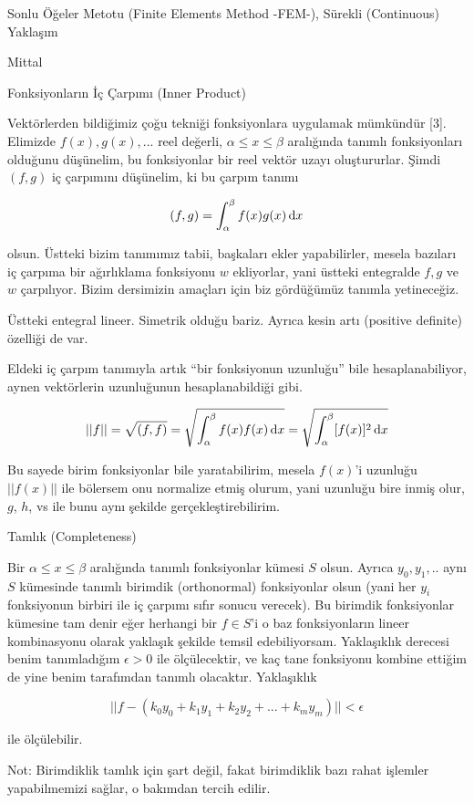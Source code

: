 \documentclass[12pt,fleqn]{article}\usepackage{../../common}
\begin{document}
Sonlu Öğeler Metotu (Finite Elements Method -FEM-), Sürekli (Continuous) Yaklaşım

Mittal

Fonksiyonların İç Çarpımı (Inner Product)

Vektörlerden bildiğimiz çoğu tekniği fonksiyonlara uygulamak mümkündür [3].
Elimizde $f(x), g(x), ...$ reel değerli, $\alpha \le x \le \beta$ aralığında
tanımlı fonksiyonları olduğunu düşünelim, bu fonksiyonlar bir reel vektör uzayı
oluştururlar. Şimdi $(f,g)$ iç çarpımını düşünelim, ki bu çarpım tanımı

$$
(f,g) = \int_{\alpha}^{\beta} f(x) g(x) \,\mathrm{d} x
$$

olsun. Üstteki bizim tanımımız tabii, başkaları ekler yapabilirler, mesela
bazıları iç çarpıma bir ağırlıklama fonksiyonu $w$ ekliyorlar, yani üstteki
entegralde $f,g$ ve $w$ çarpılıyor. Bizim dersimizin amaçları için biz
gördüğümüz tanımla yetineceğiz.

Üstteki entegral lineer. Simetrik olduğu bariz. Ayrıca kesin artı (positive
definite) özelliği de var.

Eldeki iç çarpım tanımıyla artık ``bir fonksiyonun uzunluğu'' bile
hesaplanabiliyor, aynen vektörlerin uzunluğunun hesaplanabildiği gibi.

$$
|| f || = \sqrt{ (f,f) } =
\sqrt{\int_{\alpha}^{\beta} f(x) f(x) \,\mathrm{d} x } =
\sqrt{\int_{\alpha}^{\beta} [f(x)]^2 \,\mathrm{d} x }
$$

Bu sayede birim fonksiyonlar bile yaratabilirim, mesela $f(x)$'i uzunluğu
$||f(x)||$ ile bölersem onu normalize etmiş olurum, yani uzunluğu bire inmiş
olur, $g$, $h$, vs ile bunu aynı şekilde gerçekleştirebilirim.

Tamlık (Completeness)

Bir $\alpha \le x \le \beta$ aralığında tanımlı fonksiyonlar kümesi $S$ olsun.
Ayrıca $y_0,y_1,..$ aynı $S$ kümesinde tanımlı birimdik (orthonormal)
fonksiyonlar olsun (yani her $y_i$ fonksiyonun birbiri ile iç çarpımı sıfır
sonucu verecek). Bu birimdik fonksiyonlar kümesine tam denir eğer herhangi bir
$f \in S$'i o baz fonksiyonların lineer kombinasyonu olarak yaklaşık şekilde
temsil edebiliyorsam. Yaklaşıklık derecesi benim tanımladığım $\epsilon > 0$ ile
ölçülecektir, ve kaç tane fonksiyonu kombine ettiğim de yine benim tarafımdan
tanımlı olacaktır. Yaklaşıklık

$$
|| f - (k_0 y_0 + k_1 y_1 + k_2 y_2 + ... + k_m y_m)  || < \epsilon
$$

ile ölçülebilir.

Not: Birimdiklik tamlık için şart değil, fakat birimdiklik bazı rahat işlemler
yapabilmemizi sağlar, o bakımdan tercih edilir.
\end{document}

